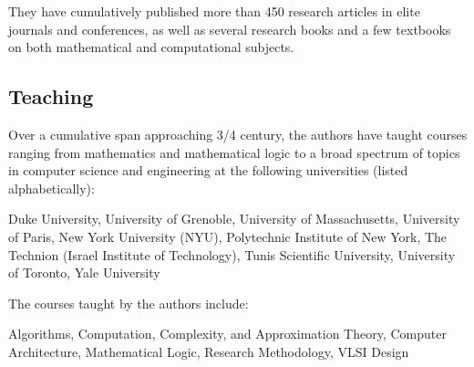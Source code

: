 \documentclass{article}[12pt]
\begin{document}
\smallskip

\noindent
They have cumulatively published more than 450 research articles in elite journals and conferences, as well as several research books and a few textbooks on both mathematical and computational subjects.  %

\smallskip

\subsection*{Teaching}

Over a cumulative span approaching 3/4 century, the authors have taught courses ranging from mathematics and mathematical logic to a broad spectrum of topics in computer science and engineering at the following universities (listed alphabetically):

\smallskip

\noindent
Duke University, 
University of Grenoble,
University of Massachusetts,
University of Paris,
New York University (NYU),
Polytechnic Institute of New York,
The Technion (Israel Institute of Technology),
Tunis Scientific University,
University of Toronto,
Yale University

\medskip

\noindent
The courses taught by the authors include:

\smallskip

\noindent
Algorithms,
Computation, Complexity, and Approximation Theory,
Computer Architecture,
Mathematical Logic,
Research Methodology,
VLSI Design
\end{document}
